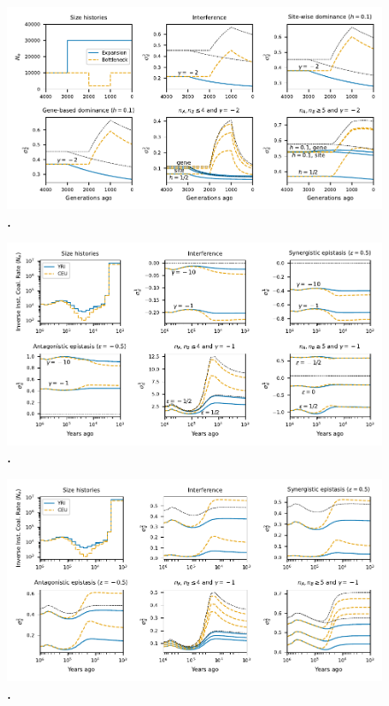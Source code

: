 \documentclass[]{article}
\begin{document}
\begin{figure}[ht!]
    \centering
    \includegraphics{../figures/demog_bottle_expand.dominance.sd2}
    \caption{
        \textbf{.}
    }
    \label{fig:toy_dom_sd2}
\end{figure}

\begin{figure}[ht!]
    \centering
    \includegraphics{../figures/demog_YRI_CEU}
    \caption{
        \textbf{.}
    }
    \label{fig:relate}
\end{figure}

\begin{figure}[ht!]
    \centering
    \includegraphics{../figures/demog_YRI_CEU.sd2}
    \caption{
        \textbf{.}
    }
    \label{fig:relate_sd2}
\end{figure}
\end{document}
